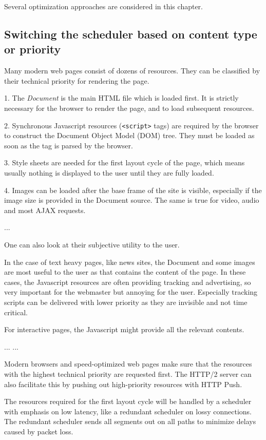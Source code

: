 \documentclass[article,type=bsc,colorback,accentcolor=tud9c]{tudthesis}
\begin{document}
Several optimization approaches are considered in this chapter.

\subsection{Switching the scheduler based on content type or priority}
Many modern web pages consist of dozens of resources. They can be classified by their technical priority for rendering the page. 

1. The \textit{Document} is the main HTML file which is loaded first. It is strictly necessary for the browser to render the page, and to load subsequent resources. 

2. Synchronous Javascript resources (\texttt{<script>} tags) are required by the browser to construct the Document Object Model (DOM) tree. They must be loaded as soon as the tag is parsed by the browser.

3. Style sheets are needed for the first layout cycle of the page, which means usually nothing is displayed to the user until they are fully loaded.

4. Images can be loaded after the base frame of the site is visible, especially if the image size is provided in the Document source. The same is true for video, audio and most AJAX requests.

...

One can also look at their subjective utility to the user.

In the case of text heavy pages, like news sites, the Document and some images are most useful to the user as that contains the content of the page. In these cases, the Javascript resources are often providing tracking and advertising, so very important for the webmaster but annoying for the user. Especially tracking scripts can be delivered with lower priority as they are invisible and not time critical.

For interactive pages, the Javascript might provide all the relevant contents.   

...  ... 

Modern browsers and speed-optimized web pages make sure that the resources with the highest technical priority are requested first. The HTTP/2 server can also facilitate this by pushing out high-priority resources with HTTP Push.

The resources required for the first layout cycle will be handled by a scheduler with emphasis on low latency, like a redundant scheduler on lossy connections. The redundant scheduler sends all segments out on all paths to minimize delays caused by packet loss.
\end{document}

